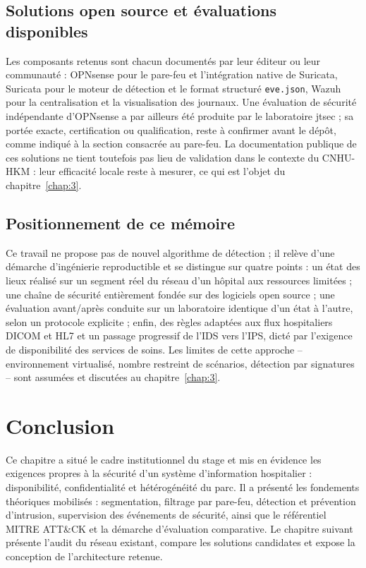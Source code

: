 \subsection{Solutions open source et évaluations disponibles}

Les composants retenus sont chacun documentés par leur éditeur ou leur communauté : OPNsense pour le pare-feu et l'intégration native de Suricata\cite{opnsensedoc}, Suricata pour le moteur de détection et le format structuré \texttt{eve.json}\cite{suricatadoc}, Wazuh pour la centralisation et la visualisation des journaux\cite{wazuhdoc}. Une évaluation de sécurité indépendante d'OPNsense a par ailleurs été produite par le laboratoire jtsec\cite{jtsec} ; sa portée exacte, certification ou qualification, reste à confirmer avant le dépôt, comme indiqué à la section consacrée au pare-feu. La documentation publique de ces solutions ne tient toutefois pas lieu de validation dans le contexte du CNHU-HKM : leur efficacité locale reste à mesurer, ce qui est l'objet du chapitre~\ref{chap:3}.

\subsection{Positionnement de ce mémoire}

Ce travail ne propose pas de nouvel algorithme de détection ; il relève d'une démarche d'ingénierie reproductible et se distingue sur quatre points : un état des lieux réalisé sur un segment réel du réseau d'un hôpital aux ressources limitées ; une chaîne de sécurité entièrement fondée sur des logiciels open source ; une évaluation avant/après conduite sur un laboratoire identique d'un état à l'autre, selon un protocole explicite ; enfin, des règles adaptées aux flux hospitaliers DICOM et HL7 et un passage progressif de l'IDS vers l'IPS, dicté par l'exigence de disponibilité des services de soins. Les limites de cette approche -- environnement virtualisé, nombre restreint de scénarios, détection par signatures -- sont assumées et discutées au chapitre~\ref{chap:3}.

\section*{Conclusion}

Ce chapitre a situé le cadre institutionnel du stage et mis en évidence les exigences propres à la sécurité d'un système d'information hospitalier : disponibilité, confidentialité et hétérogénéité du parc. Il a présenté les fondements théoriques mobilisés : segmentation, filtrage par pare-feu, détection et prévention d'intrusion, supervision des événements de sécurité, ainsi que le référentiel MITRE ATT\&CK et la démarche d'évaluation comparative. Le chapitre suivant présente l'audit du réseau existant, compare les solutions candidates et expose la conception de l'architecture retenue.
